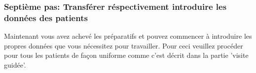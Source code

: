 \subsubsection{Septième pas: Transférer réspectivement introduire les données des patients}
Maintenant vous avez achevé les préparatifs et pouvez commencer à introduire les propres données que vous nécessitez pour travailler. Pour ceci veuillez procéder pour tous les patients de façon uniforme comme c'est décrit dans la partie 'visite guidée'.


